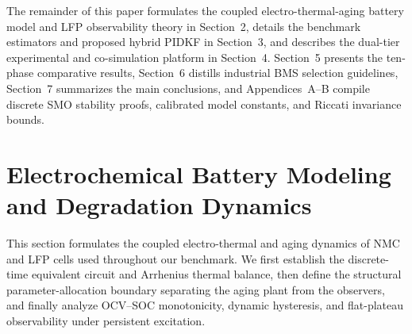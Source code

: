 \documentclass[10pt,a4paper]{article}
\begin{document}
The remainder of this paper formulates the coupled electro-thermal-aging battery model and LFP observability theory in Section~2, details the benchmark estimators and proposed hybrid PIDKF in Section~3, and describes the dual-tier experimental and co-simulation platform in Section~4. Section~5 presents the ten-phase comparative results, Section~6 distills industrial BMS selection guidelines, Section~7 summarizes the main conclusions, and Appendices~A--B compile discrete SMO stability proofs, calibrated model constants, and Riccati invariance bounds.

\section{Electrochemical Battery Modeling and Degradation Dynamics}
This section formulates the coupled electro-thermal and aging dynamics of NMC and LFP cells used throughout our benchmark. We first establish the discrete-time equivalent circuit and Arrhenius thermal balance, then define the structural parameter-allocation boundary separating the aging plant from the observers, and finally analyze OCV--SOC monotonicity, dynamic hysteresis, and flat-plateau observability under persistent excitation.
\end{document}
